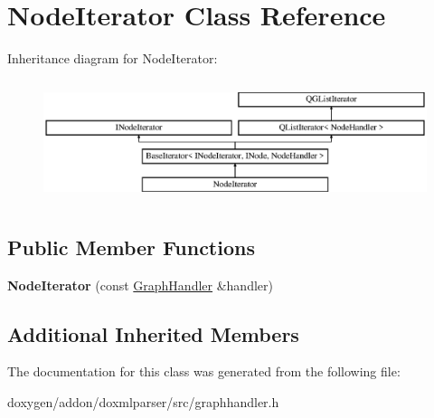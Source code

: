 \hypertarget{class_node_iterator}{}\section{Node\+Iterator Class Reference}
\label{class_node_iterator}
Inheritance diagram for Node\+Iterator\+:\begin{figure}[H]
\begin{center}
\leavevmode
\includegraphics[height=3.601286cm]{class_node_iterator}
\end{center}
\end{figure}
\subsection*{Public Member Functions}
\begin{DoxyCompactItemize}
\item 
\mbox{\label{class_node_iterator_a1d388d0af010a0a17fe9a4ab27b4b8e2}} 
{\bfseries Node\+Iterator} (const \mbox{\hyperlink{class_graph_handler}{Graph\+Handler}} \&handler)
\end{DoxyCompactItemize}
\subsection*{Additional Inherited Members}


The documentation for this class was generated from the following file\+:\begin{DoxyCompactItemize}
\item 
doxygen/addon/doxmlparser/src/graphhandler.\+h\end{DoxyCompactItemize}
